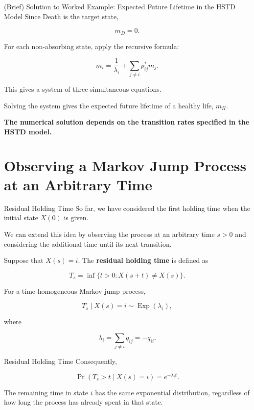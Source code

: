 \documentclass[
  ignorenonframetext,
  aspectratio=169,
]{beamer}
\begin{document}
\begin{frame}{(Brief) Solution to Worked Example: Expected Future
Lifetime in the HSTD Model}
\protect{}\label{brief-solution-to-worked-example-expected-future-lifetime-in-the-hstd-model}
Since Death is the target state,

\[
m_D=0.
\]

For each non-absorbing state, apply the recursive formula:

\[
m_i
=
\frac{1}{\lambda_i}
+
\sum_{j\neq i}p_{ij}^*m_j.
\]

This gives a system of three simultaneous equations.

Solving the system gives the expected future lifetime of a healthy life,
\(m_H\).

\textbf{The numerical solution depends on the transition rates specified
in the HSTD model.}
\end{frame}

\section{Observing a Markov Jump Process at an Arbitrary
Time}\label{observing-a-markov-jump-process-at-an-arbitrary-time}

\begin{frame}{Residual Holding Time}
\protect{}\label{residual-holding-time}
So far, we have considered the first holding time when the initial state
\(X(0)\) is given.

We can extend this idea by observing the process at an arbitrary time
\(s>0\) and considering the additional time until its next transition.

Suppose that \(X(s)=i\). The \textbf{residual holding time} is defined
as

\[
T_s=\inf\{t>0:X(s+t)\neq X(s)\}.
\]

For a time-homogeneous Markov jump process,

\[
\boxed{
T_s\mid X(s)=i\sim\operatorname{Exp}(\lambda_i),
}
\]

where

\[
\lambda_i=\sum_{j\neq i}q_{ij}=-q_{ii}.
\]
\end{frame}

\begin{frame}{Residual Holding Time}
\protect{}\label{residual-holding-time-1}
Consequently,

\[
\Pr(T_s>t\mid X(s)=i)=e^{-\lambda_i t}.
\]

The remaining time in state \(i\) has the same exponential distribution,
regardless of how long the process has already spent in that state.
\end{frame}
\end{document}
